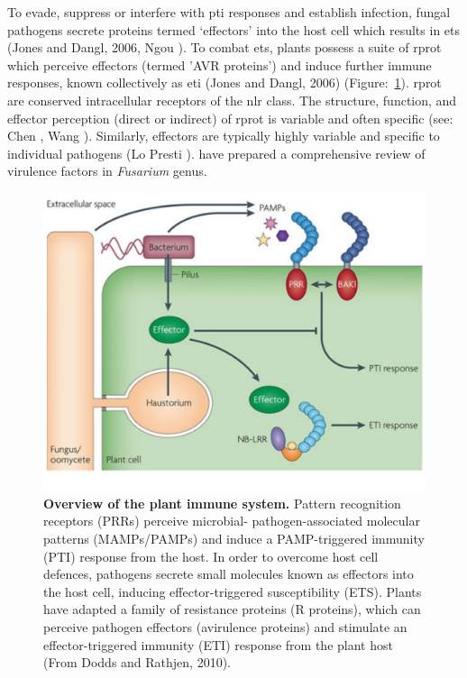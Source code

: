 To evade, suppress or interfere with \ac{pti} responses and establish infection, fungal pathogens secrete proteins termed ‘effectors’ into the host cell which results in \ac{ets} (Jones and Dangl, 2006, Ngou ). To combat \ac{ets}, plants possess a suite of \ac{rprot} which perceive effectors (termed '\ac{AVR} proteins') and induce further immune responses, known collectively as \ac{eti} (Jones and Dangl, 2006) (Figure:~\ref{fig:PlantImmuneSystem}). \Ac{rprot} are conserved intracellular receptors of the \ac{nlr} class. The structure, function, and effector perception (direct or indirect) of \ac{rprot} is variable and often specific (see: Chen , Wang ). Similarly, effectors are typically highly variable and specific to individual pathogens (Lo Presti ). \parencite{Gutierrez2023} have prepared a comprehensive review of virulence factors in \textit{Fusarium} genus. 

\begin{figure}[h!]
    \centering
    \includegraphics[width=14cm]{Figures/DoddsArticleModel.pdf}
    \caption[Overview of the plant immune system.]{\textbf{Overview of the plant immune system.} Pattern recognition receptors (PRRs) perceive microbial- pathogen-associated molecular patterns (MAMPs/PAMPs) and induce a PAMP-triggered immunity (PTI) response from the host. In order to overcome host cell defences, pathogens secrete small molecules known as effectors into the host cell, inducing effector-triggered susceptibility (ETS). Plants have adapted a family of resistance proteins (R proteins), which can perceive pathogen effectors (avirulence proteins) and stimulate an effector-triggered immunity (ETI) response from the plant host (From Dodds and Rathjen, 2010).}
    \label{fig:PlantImmuneSystem}
\end{figure}

